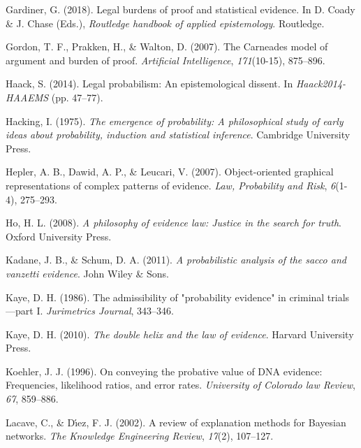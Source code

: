 \documentclass[11pt,dvipsnames,enabledeprecatedfontcommands]{scrartcl}
\begin{document}
\leavevmode\hypertarget{ref-gardiner2018}{}%
Gardiner, G. (2018). Legal burdens of proof and statistical evidence. In
D. Coady \& J. Chase (Eds.), \emph{Routledge handbook of applied
epistemology}. Routledge.

\leavevmode\hypertarget{ref-gordon2007}{}%
Gordon, T. F., Prakken, H., \& Walton, D. (2007). The Carneades model of
argument and burden of proof. \emph{Artificial Intelligence},
\emph{171}(10-15), 875--896.

\leavevmode\hypertarget{ref-haack2011legal}{}%
Haack, S. (2014). Legal probabilism: An epistemological dissent. In
\emph{Haack2014-HAAEMS} (pp. 47--77).

\leavevmode\hypertarget{ref-Hacking1984}{}%
Hacking, I. (1975). \emph{The emergence of probability: A philosophical
study of early ideas about probability, induction and statistical
inference}. Cambridge University Press.

\leavevmode\hypertarget{ref-hepler2007ObjectorientedGraphicalRepresentations}{}%
Hepler, A. B., Dawid, A. P., \& Leucari, V. (2007). Object-oriented
graphical representations of complex patterns of evidence. \emph{Law,
Probability and Risk}, \emph{6}(1-4), 275--293.

\leavevmode\hypertarget{ref-ho2008philosophy}{}%
Ho, H. L. (2008). \emph{A philosophy of evidence law: Justice in the
search for truth}. Oxford University Press.

\leavevmode\hypertarget{ref-kadane2011probabilistic}{}%
Kadane, J. B., \& Schum, D. A. (2011). \emph{A probabilistic analysis of
the sacco and vanzetti evidence}. John Wiley \& Sons.

\leavevmode\hypertarget{ref-kaye1986admissibility}{}%
Kaye, D. H. (1986). The admissibility of "probability evidence" in
criminal trials---part I. \emph{Jurimetrics Journal}, 343--346.

\leavevmode\hypertarget{ref-Kaye2010The-Double-Heli}{}%
Kaye, D. H. (2010). \emph{The double helix and the law of evidence}.
Harvard University Press.

\leavevmode\hypertarget{ref-Koehler1996On-Conveying-th}{}%
Koehler, J. J. (1996). On conveying the probative value of DNA evidence:
Frequencies, likelihood ratios, and error rates. \emph{University of
Colorado law Review}, \emph{67}, 859--886.

\leavevmode\hypertarget{ref-lacave2002ReviewExplanationMethodsa}{}%
Lacave, C., \& Dı́ez, F. J. (2002). A review of explanation methods for
Bayesian networks. \emph{The Knowledge Engineering Review},
\emph{17}(2), 107--127.
\end{document}
